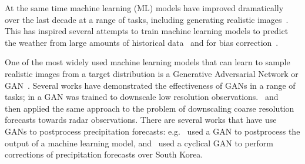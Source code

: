 \documentclass{article}
\begin{document}


At the same time machine learning (ML) models have improved dramatically over the last decade at a range of tasks, including generating realistic images~\citep{karras_style-based_2019}. This has inspired several attempts to train machine learning models to predict the weather from large amounts of historical data~\citep{nguyen_climax_2023, bi_pangu-weather_2022,ravuri_skilful_2021, zhang_skilful_2023,lam_graphcast_2022} and for bias correction~\citep{rasp_neural_2018,ben-bouallegue_improving_2023}.

One of the most widely used machine learning models that can learn to sample realistic images from a target distribution is a Generative Adversarial Network or GAN~\citep{goodfellow_generative_2014}. Several works have demonstrated the effectiveness of GANs in a range of tasks; in \cite{leinonen_stochastic_2020} a GAN was trained to downscale low resolution observations.~\cite{harris_generative_2022} and~\cite{price_increasing_2022} then applied the same approach to the problem of downscaling coarse resolution forecasts towards radar observations. There are several works that have use GANs to postprocess precipitation forecasts: e.g.~\cite{duncan_generative_2022} used a GAN to postprocess the output of a machine learning model, and~\cite{jeong_correcting_2023} used a cyclical GAN to perform corrections of precipitation forecasts over South Korea. 

\end{document}
